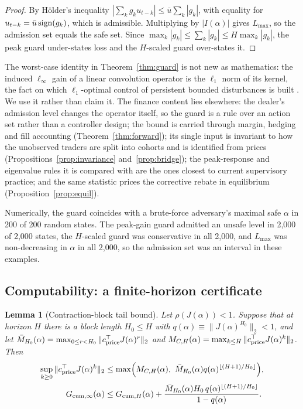 \documentclass[12pt]{article}
\newtheorem{lemma}[theorem]{Lemma}
\theoremstyle{definition}
\theoremstyle{remark}
\begin{document}
\begin{proof}
By H\"older's inequality $|\sum_kg_ku_{t-k}|\le\bar u\sum_k|g_k|$, with equality for $u_{t-k}=\bar u\,{\rm sign}(g_k)$, which is admissible. Multiplying by $|I(\alpha)|$ gives $L_{\max}$, so the admission set equals the safe set. Since $\max_k|g_k|\le\sum_k|g_k|\le H\max_k|g_k|$, the peak guard under-states loss and the $H$-scaled guard over-states it.
\end{proof}

The worst-case identity in Theorem~\ref{thm:guard} is not new as mathematics: the induced $\ell_\infty$ gain of a linear convolution operator is the $\ell_1$ norm of its kernel, the fact on which $\ell_1$-optimal control of persistent bounded disturbances is built \citep{vidyasagar1986,dahleh1987,dahleh1995}. We use it rather than claim it. The finance content lies elsewhere: the dealer's admission level changes the operator itself, so the guard is a rule over an action set rather than a controller design; the bound is carried through margin, hedging and fill accounting (Theorem~\ref{thm:forward}); its single input is invariant to how the unobserved traders are split into cohorts and is identified from prices (Propositions~\ref{prop:invariance} and~\ref{prop:bridge}); the peak-response and eigenvalue rules it is compared with are the ones closest to current supervisory practice; and the same statistic prices the corrective rebate in equilibrium (Proposition~\ref{prop:equil}).

Numerically, the guard coincides with a brute-force adversary's maximal safe $\alpha$ in 200 of 200 random states. The peak-gain guard admitted an unsafe level in 2,000 of 2,000 states, the $H$-scaled guard was conservative in all 2,000, and $L_{\max}$ was non-decreasing in $\alpha$ in all 2,000, so the admission set was an interval in these examples.

\subsection{Computability: a finite-horizon certificate}

\begin{lemma}[Contraction-block tail bound]\label{lem:tail}
Let $\rho(J(\alpha))<1$. Suppose that at horizon $H$ there is a block length $H_0\le H$ with $q(\alpha)\equiv\|J(\alpha)^{H_0}\|_2<1$, and let $\bar M_{H_0}(\alpha)=\max_{0\le r<H_0}\|c^\top_{\rm price}J(\alpha)^r\|_2$ and $M_{C,H}(\alpha)=\max_{k\le H}\|c^\top_{\rm price}J(\alpha)^k\|_2$. Then
\begin{align}
\sup_{k\ge0}\|c^\top_{\rm price}J(\alpha)^k\|_2&\le\max\Bigl(M_{C,H}(\alpha),\ \bar M_{H_0}(\alpha)q(\alpha)^{\lfloor(H+1)/H_0\rfloor}\Bigr),\label{eq:tail}\\
G_{{\rm cum},\infty}(\alpha)&\le G_{{\rm cum},H}(\alpha)+\frac{\bar M_{H_0}(\alpha)H_0\,q(\alpha)^{\lfloor(H+1)/H_0\rfloor}}{1-q(\alpha)}.\notag
\end{align}
\end{lemma}
\end{document}
